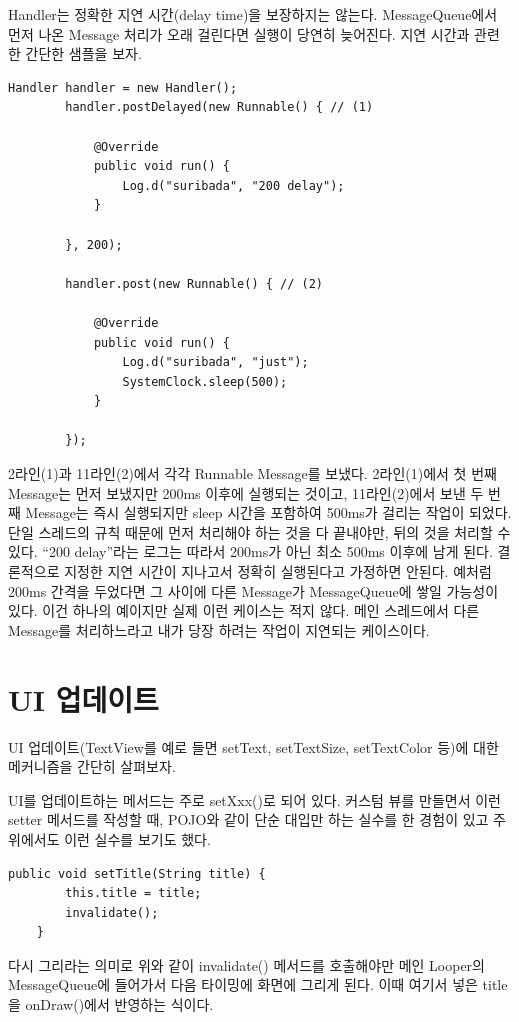 Handler는 정확한 지연 시간(delay time)을 보장하지는 않는다. MessageQueue에서 먼저 나온 Message 처리가 오래 걸린다면 실행이 당연히 늦어진다. 지연 시간과 관련한 간단한 샘플을 보자.
\begin{lstlisting}[frame=single, caption=부정확한 지연시간] 
		Handler handler = new Handler();
		handler.postDelayed(new Runnable() { // (1)

			@Override
			public void run() {
				Log.d("suribada", "200 delay");
			}
			
		}, 200);
		
		handler.post(new Runnable() { // (2)

			@Override
			public void run() {
				Log.d("suribada", "just");
				SystemClock.sleep(500);
			}
			
		});
\end{lstlisting}
2라인(1)과 11라인(2)에서 각각 Runnable Message를 보냈다. 2라인(1)에서 첫 번째 Message는 먼저 보냈지만 200ms 이후에 실행되는 것이고, 11라인(2)에서 보낸 두 번째 Message는 즉시 실행되지만 sleep 시간을 포함하여 500ms가 걸리는 작업이 되었다. 
단일 스레드의 규칙 때문에 먼저 처리해야 하는 것을 다 끝내야만, 뒤의 것을 처리할 수 있다. ``200 delay''라는 로그는 따라서 200ms가 아닌 최소 500ms 이후에 남게 된다.
결론적으로 지정한 지연 시간이 지나고서 정확히 실행된다고 가정하면 안된다. 예처럼 200ms 간격을 두었다면 그 사이에 다른 Message가 MessageQueue에 쌓일 가능성이 있다.
이건 하나의 예이지만 실제 이런 케이스는 적지 않다. 메인 스레드에서 다른 Message를 처리하느라고 내가 당장 하려는 작업이 지연되는 케이스이다.\\

\section{UI 업데이트}
UI 업데이트(TextView를 예로 들면 setText, setTextSize, setTextColor 등)에 대한 메커니즘을 간단히 살펴보자.

UI를 업데이트하는 메서드는 주로 setXxx()로 되어 있다. 커스텀 뷰를 만들면서 이런 setter 메서드를 작성할 때, POJO와 같이 단순 대입만 하는 실수를 한 경험이 있고 주위에서도 이런 실수를 보기도 했다. 
\begin{lstlisting}[frame=single]
	public void setTitle(String title) {
		this.title = title;
		invalidate();
	}
\end{lstlisting}
다시 그리라는 의미로 위와 같이 invalidate() 메서드를 호출해야만 메인 Looper의 MessageQueue에 들어가서 다음 타이밍에 화면에 그리게 된다. 이때 여기서 넣은 title을 onDraw()에서 반영하는 식이다.\\

